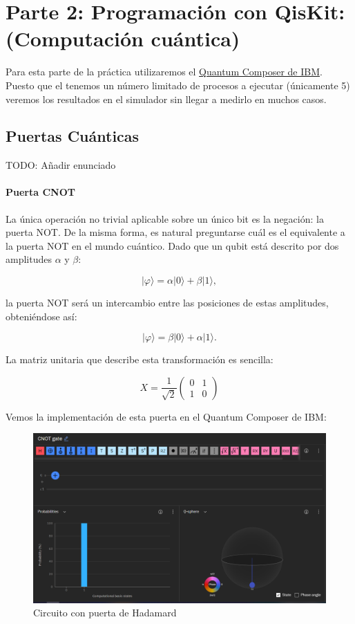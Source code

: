 \documentclass[11pt]{article}
\newcommand{\ra}{\rangle}
\begin{document}
\section{Parte 2: Programación con QisKit: (Computación cuántica)}

Para esta parte de la práctica utilizaremos el \href{https://quantum-computing.ibm.com/composer}{Quantum Composer de IBM}. Puesto que el tenemos un número limitado de procesos a ejecutar (únicamente 5) veremos los resultados en el simulador sin llegar a medirlo en muchos casos.

\subsection{Puertas Cuánticas}

TODO: Añadir enunciado


\paragraph*{Puerta CNOT}

La única operación no trivial aplicable sobre un único bit es la negación: la puerta NOT. De la misma forma, es natural preguntarse cuál es el equivalente a la puerta NOT en el mundo cuántico. Dado que un qubit está descrito por dos amplitudes $\alpha$ y $\beta$:

\[
	|\varphi\ra = \alpha |0\ra + \beta |1\ra,
\]

la puerta NOT será un intercambio entre las posiciones de estas amplitudes, obteniéndose así:

\[
	|\varphi\ra = \beta |0\ra + \alpha |1\ra.
\]

La matriz unitaria que describe esta transformación es sencilla:

\[
X = \frac{1}{\sqrt 2}
\begin{pmatrix}
	0 & 1 \\
	1 & 0 
\end{pmatrix}
\]

Vemos la implementación de esta puerta en el Quantum Composer de IBM:

\begin{figure}[H]
	\centering
	\includegraphics[scale=0.4]{figures/gate-x.png}
	\caption{Circuito con puerta de Hadamard}
\end{figure}
\end{document}
